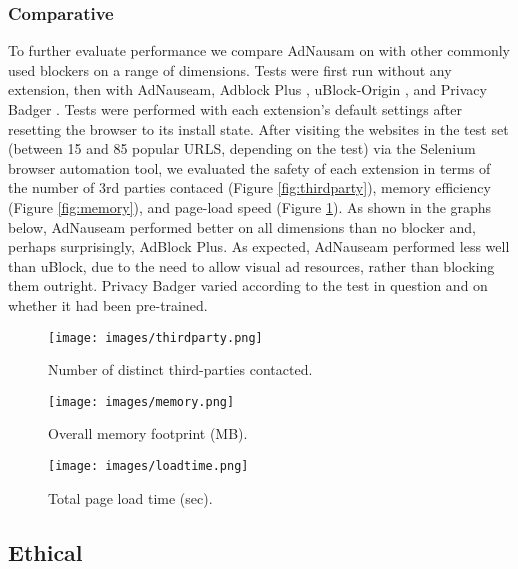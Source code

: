 \documentclass[conference]{IEEEtran}
\begin{document}
\subsubsection{Comparative}

To further evaluate performance we compare AdNausam on with other commonly used blockers on a range of dimensions. Tests were first run without any extension, then with AdNauseam, Adblock Plus \cite{AdBlock}, uBlock-Origin \cite{Gorhill}, and Privacy Badger \cite{EFF-0}. Tests were performed with each extension's default settings after resetting the browser to its install state. After visiting the websites in the test set (between 15 and 85 popular URLS, depending on the test) via the Selenium browser automation tool, we evaluated the safety of each extension in terms of the number of 3rd parties contaced (Figure \ref{fig:thirdparty}), memory efficiency (Figure \ref{fig:memory}), and page-load speed (Figure \ref{fig:loadtime}). As shown in the graphs below, AdNauseam performed better on all dimensions than no blocker and, perhaps surprisingly, AdBlock Plus. As expected, AdNauseam performed less well than uBlock, due to the need to allow visual ad resources, rather than blocking them outright. Privacy Badger varied according to the test in question and on whether it had been pre-trained.

\begin{figure}[!t]
\centering
\texttt{[image: images/thirdparty.png]}
\caption{Number of distinct third-parties contacted.}
\label{fig:thirdparty}
\vspace{6mm}
\texttt{[image: images/memory.png]}
\caption{Overall memory footprint (MB).}
\label{fig:memory}
\vspace{6mm}
\texttt{[image: images/loadtime.png]}
\caption{Total page load time (sec).}
\label{fig:loadtime}
\end{figure}


\subsection{Ethical}
\end{document}
